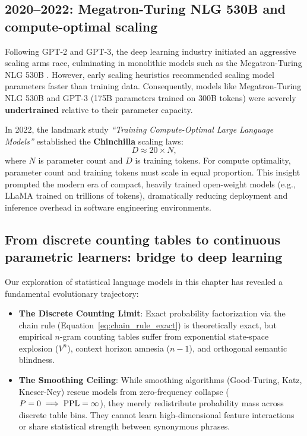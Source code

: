 \documentclass[../../main.tex]{subfiles}
\begin{document}
\subsection{2020--2022: Megatron-Turing NLG 530B and compute-optimal scaling}
\label{subsec:milestone_scaling}

Following GPT-2 and GPT-3, the deep learning industry initiated an aggressive scaling arms race, culminating in monolithic models such as the Megatron-Turing NLG 530B \cite{smith2022mtnlg}. However, early scaling heuristics \cite{kaplan2020} recommended scaling model parameters faster than training data. Consequently, models like Megatron-Turing NLG 530B and GPT-3 (175B parameters trained on 300B tokens) were severely \textbf{undertrained} relative to their parameter capacity.

In 2022, the landmark study \textit{``Training Compute-Optimal Large Language Models''} \cite{hoffmann2022} established the \textbf{Chinchilla} scaling laws:
\begin{equation}
\label{eq:chinchilla_ratio}
D \approx 20 \times N,
\end{equation}
where $N$ is parameter count and $D$ is training tokens. For compute optimality, parameter count and training tokens must scale in equal proportion. This insight prompted the modern era of compact, heavily trained open-weight models (e.g., LLaMA \cite{touvron2023llama} trained on trillions of tokens), dramatically reducing deployment and inference overhead in software engineering environments.

\subsection{From discrete counting tables to continuous parametric learners: bridge to deep learning}
\label{subsec:bridge_to_ch02}

Our exploration of statistical language models in this chapter has revealed a fundamental evolutionary trajectory:
\begin{itemize}
    \item \textbf{The Discrete Counting Limit}: Exact probability factorization via the chain rule (Equation~\eqref{eq:chain_rule_exact}) is theoretically exact, but empirical $n$-gram counting tables suffer from exponential state-space explosion ($V^n$), context horizon amnesia ($n-1$), and orthogonal semantic blindness.
    \item \textbf{The Smoothing Ceiling}: While smoothing algorithms (Good-Turing, Katz, Kneser-Ney) rescue models from zero-frequency collapse ($P=0 \implies \mathrm{PPL}=\infty$), they merely redistribute probability mass across discrete table bins. They cannot learn high-dimensional feature interactions or share statistical strength between synonymous phrases.
\end{itemize}
\end{document}
